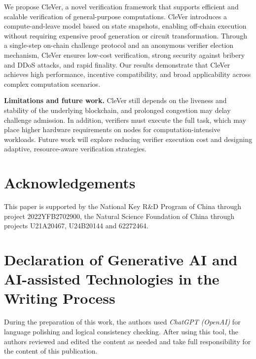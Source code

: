 \documentclass[3p]{elsarticle}
\theoremstyle{remark}
\begin{document}
We propose CleVer, a novel verification framework that supports efficient and scalable verification of general-purpose computations. CleVer introduces a compute-and-leave model based on state snapshots, enabling off-chain execution without requiring expensive proof generation or circuit transformation. Through a single-step on-chain challenge protocol and an anonymous verifier election mechanism, CleVer ensures low-cost verification, strong security against bribery and DDoS attacks, and rapid finality. Our results demonstrate that CleVer achieves high performance, incentive compatibility, and broad applicability across complex computation scenarios.

\textbf{Limitations and future work.} CleVer still depends on the liveness and stability of the underlying blockchain, and prolonged congestion may delay challenge admission. In addition, verifiers must execute the full task, which may place higher hardware requirements on nodes for computation-intensive workloads. Future work will explore reducing verifier execution cost and designing adaptive, resource-aware verification strategies.

\section*{Acknowledgements}
This paper is supported by the National Key R\&D Program of China through project 2022YFB2702900, the Natural Science Foundation of China through projects U21A20467, U24B20144 and 62272464.

\section*{Declaration of Generative AI and AI-assisted Technologies in the Writing Process}

During the preparation of this work, the authors used \textit{ChatGPT (OpenAI)} for language polishing and logical consistency checking. After using this tool, the authors reviewed and edited the content as needed and take full responsibility for the content of this publication.







\appendix
\end{document}
